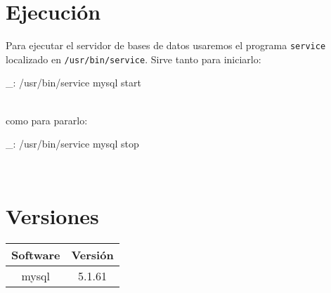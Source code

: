 \section{Ejecución}

Para ejecutar el servidor de bases de datos usaremos el programa \texttt{service} localizado en \texttt{/usr/bin/service}. Sirve tanto para iniciarlo:

\begin{bashcode}
_: /usr/bin/service mysql start
\end{bashcode}
\\

como para pararlo:
\begin{bashcode}
_: /usr/bin/service mysql stop
\end{bashcode}
\\


\section{Versiones}

\begin{tabular}{|c|c|}
   \hline
   Software & Versión \\ \hline
   mysql & 5.1.61 \\ \hline
\end{tabular}
